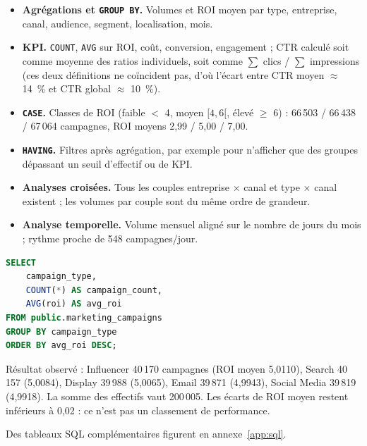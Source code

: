 \begin{itemize}
\item \textbf{Agrégations et \texttt{GROUP BY}.} Volumes et ROI moyen par type, entreprise, canal, audience, segment, localisation, mois.
\item \textbf{KPI.} \texttt{COUNT}, \texttt{AVG} sur ROI, coût, conversion, engagement ; CTR calculé soit comme moyenne des ratios individuels, soit comme $\sum$ clics / $\sum$ impressions (ces deux définitions ne coïncident pas, d'où l'écart entre CTR moyen $\approx$ 14~\% et CTR global $\approx$ 10~\%).
\item \textbf{\texttt{CASE}.} Classes de ROI (faible $<$ 4, moyen $[4,6[$, élevé $\geq$ 6) : 66\,503 / 66\,438 / 67\,064 campagnes, ROI moyens 2,99 / 5,00 / 7,00.
\item \textbf{\texttt{HAVING}.} Filtres après agrégation, par exemple pour n'afficher que des groupes dépassant un seuil d'effectif ou de KPI.
\item \textbf{Analyses croisées.} Tous les couples entreprise $\times$ canal et type $\times$ canal existent ; les volumes par couple sont du même ordre de grandeur.
\item \textbf{Analyse temporelle.} Volume mensuel aligné sur le nombre de jours du mois ; rythme proche de 548 campagnes/jour.
\end{itemize}

\begin{lstlisting}[language=SQL, caption={Exemple d'agrégation SQL (ROI moyen par type)}, label={lst:sql-groupby}]
SELECT
    campaign_type,
    COUNT(*) AS campaign_count,
    AVG(roi) AS avg_roi
FROM public.marketing_campaigns
GROUP BY campaign_type
ORDER BY avg_roi DESC;
\end{lstlisting}

Résultat observé : Influencer 40\,170 campagnes (ROI moyen 5,0110), Search 40\,157 (5,0084), Display 39\,988 (5,0065), Email 39\,871 (4,9943), Social Media 39\,819 (4,9918). La somme des effectifs vaut 200\,005. Les écarts de ROI moyen restent inférieurs à 0,02 : ce n'est pas un classement de performance.

Des tableaux SQL complémentaires figurent en annexe~\ref{app:sql}.
